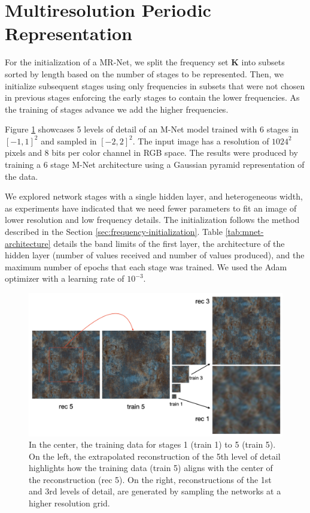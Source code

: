\section{Multiresolution Periodic Representation}

For the initialization of a MR-Net, we split the frequency set $\textbf{K}$ into subsets sorted by length based on the number of stages to be represented. Then, we initialize subsequent stages using only frequencies in subsets that were not chosen in previous stages enforcing the early stages to contain the lower frequencies. As the training of stages advance we add the higher frequencies.

Figure \ref{f:mr-periodic} showcases 5 levels of detail of an M-Net model trained with 6 stages in $[-1, 1]^2$ and sampled in $[-2, 2]^2$. The input image has a resolution of $1024^2$ pixels and $8$ bits per color channel in RGB space. The results were produced by training a $6$ stage M-Net architecture \cite{paz2022} using a Gaussian pyramid representation of the data. 

We explored network stages with a single hidden layer, and heterogeneous width, as experiments have indicated that we need fewer parameters to fit an image of lower resolution and low frequency details. The initialization follows the method described in the Section \ref{sec:frequency-initialization}. Table \ref{tab:mnet-architecture} details the band limits of the first layer, the architecture of the hidden layer (number of values received and number of values produced), and the maximum number of epochs that each stage was trained. We used the Adam optimizer with a learning rate of $10^{-3}$.

\begin{figure}[!ht]
    \centering
    \includegraphics[width=0.90\linewidth]{img/ch6/diagram.png}
    \caption{In the center, the training data for stages 1 (train 1) to 5 (train 5). On the left, the extrapolated reconstruction of the 5th level of detail highlights how the training data (train 5) aligns with the center of the reconstruction (rec 5). On the right, reconstructions of the 1st and 3rd levels of detail, are generated by sampling the networks at a higher resolution grid.}
    \label{f:mr-periodic}
\end{figure}


